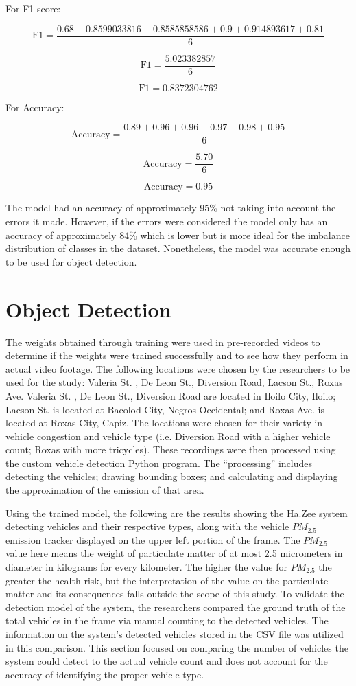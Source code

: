For F1-score:

\[{\text{F1}}= \frac{0.68 + 0.8599033816 + 0.8585858586 + 0.9 + 0.914893617 + 0.81}{6} \]

\[{\text{F1}}=  \frac{5.023382857}{6} \]


\[{\text{F1}}= 0.8372304762 \]

For Accuracy:


\[{\text{Accuracy}}= \frac{0.89 + 0.96 + 0.96 + 0.97 + 0.98 + 0.95}{6} \]

\[{\text{Accuracy}}=  \frac{5.70}{6} \]


\[{\text{Accuracy}}= 0.95 \]

The model had an accuracy of approximately 95\% not taking into account the errors it made. However, if the errors were considered the model only has an accuracy of approximately 84\% which is lower but is more ideal for the imbalance distribution of classes in the dataset. Nonetheless, the model was accurate enough to be used for object detection.




\section{Object Detection}

The weights obtained through training were used in pre-recorded videos to determine if the weights were trained successfully and to see how they perform in actual video footage. The following locations were chosen by the researchers to be used for the study: Valeria St. , De Leon St., Diversion Road, Lacson St., Roxas Ave. Valeria St. , De Leon St., Diversion Road are located in Iloilo City, Iloilo; Lacson St. is located at Bacolod City, Negros Occidental; and Roxas Ave. is located at Roxas City, Capiz.  The locations were chosen for their variety in vehicle congestion and vehicle type (i.e. Diversion Road with a higher vehicle count; Roxas with more tricycles).  These recordings were then processed using the custom vehicle detection Python program. The “processing” includes detecting the vehicles; drawing bounding boxes; and calculating and displaying the approximation of the emission of that area. 

Using the trained model,  the following are the results showing the Ha.Zee system detecting vehicles and their respective types, along with the vehicle $PM_{2.5}$ emission tracker displayed on the upper left portion of the frame. The $PM_{2.5}$ value here means the weight of particulate matter of at most 2.5 micrometers in diameter in kilograms for every kilometer. The higher the value for $PM_{2.5}$ the greater the health risk, but the interpretation of the value on the particulate matter and its consequences falls outside the scope of this study.  To validate the detection model of the system, the researchers compared the ground truth of the total vehicles in the frame via manual counting to the detected vehicles. The information on the system’s detected vehicles stored in the CSV file was utilized in this comparison. This section focused on comparing the number of vehicles the system could detect to the actual vehicle count and does not account for the accuracy of identifying the proper vehicle type.


